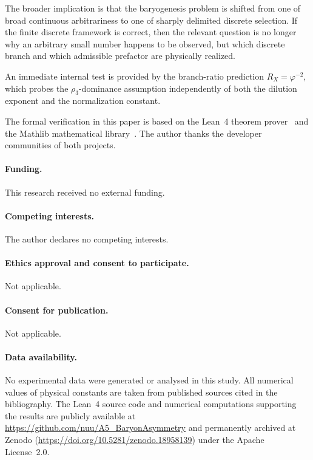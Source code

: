 \documentclass[sn-mathphys-num,Numbered]{sn-jnl}
\theoremstyle{thmstyleone}
\theoremstyle{thmstylethree}
\theoremstyle{thmstyletwo}
\begin{document}
The broader implication is that the baryogenesis problem is shifted from
one of broad continuous arbitrariness to one of sharply delimited
discrete selection. If the finite discrete framework is correct, then
the relevant question is no longer why an arbitrary small number happens
to be observed, but which discrete branch and which admissible
prefactor are physically realized.

An immediate internal test is provided by the branch-ratio prediction
$R_X=\varphi^{-2}$, which probes the $\rho_3$-dominance assumption
independently of both the dilution exponent and the normalization
constant.

\backmatter


The formal verification in this paper is based on the Lean~4
theorem prover~\cite{Lean4} and the Mathlib mathematical
library~\cite{Mathlib}.
The author thanks the developer communities of both projects.


\paragraph{Funding.}
This research received no external funding.

\paragraph{Competing interests.}
The author declares no competing interests.

\paragraph{Ethics approval and consent to participate.}
Not applicable.

\paragraph{Consent for publication.}
Not applicable.

\paragraph{Data availability.}
No experimental data were generated or analysed in this study.
All numerical values of physical constants are taken from published
sources cited in the bibliography.
The Lean~4 source code and numerical computations supporting the
results are publicly available at
\url{https://github.com/nuu/A5_BaryonAsymmetry}
and permanently archived at Zenodo
(\url{https://doi.org/10.5281/zenodo.18958139})
under the Apache License~2.0.
\end{document}
